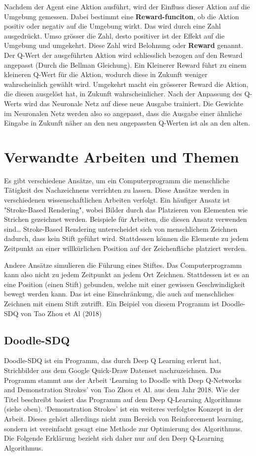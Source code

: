 Nachdem der Agent eine Aktion ausführt, wird der Einfluss dieser Aktion auf die
Umgebung gemessen. Dabei bestimmt eine \textbf{Reward-funciton}, ob die Aktion
positiv oder negativ auf die Umgebung wirkt. Das wird durch eine Zahl
ausgedrückt. Umso grösser die Zahl, desto positiver ist der Effekt auf die
Umgebung und umgekehrt. Diese Zahl wird Belohnung oder \textbf{Reward} genannt.
Der Q-Wert der ausgeführten Aktion wird schliesslich bezogen auf den Reward
angepasst (Durch die Bellman Gleichung). Ein Kleinerer Reward führt zu einem
kleineren Q-Wert für die Aktion, wodurch diese in Zukunft weniger wahrscheinlich
gewählt wird. Umgekehrt macht ein grösserer Reward die Aktion, die diesen
ausgelöst hat, in Zukunft wahrscheinlicher. Nach der Anpassung des Q-Werts wird
das Neuronale Netz auf diese neue Ausgabe trainiert. Die Gewichte im Neuronalen
Netz werden also so angepasst, dass die Ausgabe einer ähnliche Eingabe in
Zukunft näher an den neu angepassten Q-Werten ist als an den alten.

\section{Verwandte Arbeiten und Themen}
\label{chap:t_verwandt}
Es gibt verschiedene Ansätze, um ein Computerprogramm die menschliche Tätigkeit
des Nachzeichnens verrichten zu lassen. Diese Ansätze werden in verschiedenen
wissenschaftlichen Arbeiten verfolgt. Ein häufiger Ansatz ist "Stroke-Based
Rendering", wobei Bilder durch das Platzieren von Elementen wie Strichen
gezeichnet werden. Beispiele für Arbeiten, die diesen Ansatz verwenden sind\dots
Stroke-Based Rendering unterscheidet sich von menschlichem Zeichnen dadurch,
dass kein Stift geführt wird. Stattdessen können die Elemente zu jedem Zeitpunkt
an einer willkürlichen Position auf der Zeichenfläche platziert werden.

Andere Ansätze simulieren die Führung eines Stiftes. Das Computerprogramm kann
also nicht zu jedem Zeitpunkt an jedem Ort Zeichnen. Stattdessen ist es an eine
Position (einen Stift) gebunden, welche mit einer gewissen Geschwindigkeit
bewegt werden kann. Das ist eine Einschränkung, die auch auf menschliches
Zeichnen mit einem Stift zutrifft. Ein Beipiel von diesem Programm ist Doodle-SDQ von Tao Zhou et Al (2018)

\subsection*{Doodle-SDQ}
Doodle-SDQ ist ein Programm, das durch Deep Q Learning erlernt hat, Strichbilder
aus dem Google Quick-Draw Datenset nachzuzeichnen. Das Programm stammt aus der
Arbeit `Learning to Doodle with Deep Q-Networks and Demonstration Strokes' von
Tao Zhou et Al. aus dem Jahr 2018. Wie der Titel beschreibt basiert das Programm
auf dem Deep Q-Learning Algorithmus (siehe oben). `Demonstration Strokes' ist
ein weiteres verfolgtes Konzept in der Arbeit. Dieses gehört allerdings nicht
zum Bereich von Reinforcement learning, sondern ist vereinfacht gesagt eine
Methode zur Optimierung des Algorithmus. Die Folgende Erklärung bezieht sich
daher nur auf den Deep Q-Learning Algorithmus.

